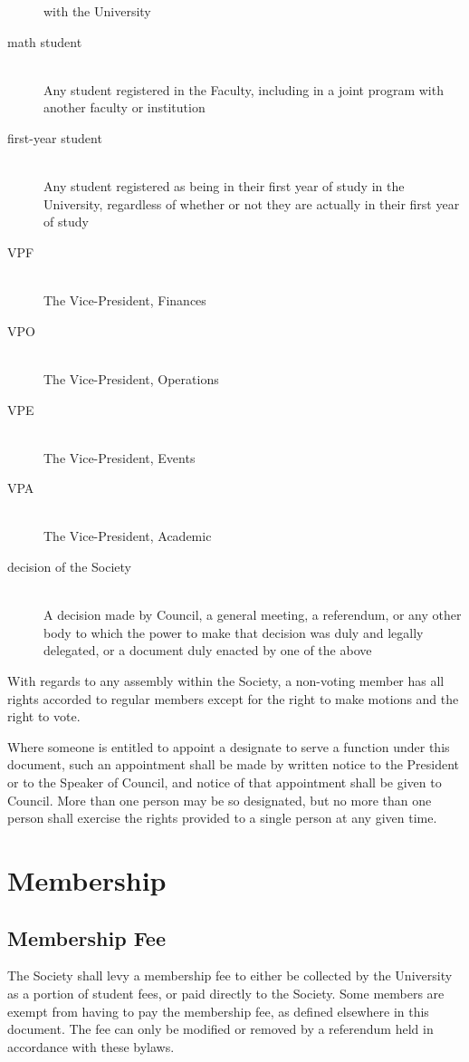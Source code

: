 \begin{description}
  with the University
\item[math student]\hfill\\
  Any student registered in the Faculty, including in a joint program with
  another faculty or institution
\item[first-year student]\hfill\\
  Any student registered as being in their first year of study in the
  University, regardless of whether or not they are actually in their first year
  of study
\item[VPF]\hfill\\
  The Vice-President, Finances
\item[VPO]\hfill\\
  The Vice-President, Operations
\item[VPE]\hfill\\
  The Vice-President, Events
\item[VPA]\hfill\\
  The Vice-President, Academic
\item[decision of the Society]\hfill\\
  A decision made by Council, a general meeting, a referendum, or any other body
  to which the power to make that decision was duly and legally delegated, or a
  document duly enacted by one of the above
\end{description}

With regards to any assembly within the Society, a non-voting member has all
rights accorded to regular members except for the right to make motions and
the right to vote.

Where someone is entitled to appoint a designate to serve a function
under this document, such an appointment shall be made by written notice to
the President or to the Speaker of Council, and notice of that appointment
shall be given to Council. More than one person may be so designated, but no
more than one person shall exercise the rights provided to a single person at
any given time.

\section{Membership}
\subsection{Membership Fee}
The Society shall levy a membership fee to either be collected by the University
as a portion of student fees, or paid directly to the Society. Some members are
exempt from having to pay the membership fee, as defined elsewhere in this
document. The fee can only be modified or removed by a referendum held in
accordance with these bylaws.

